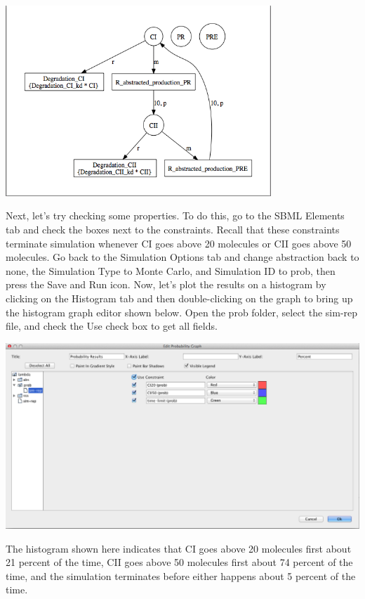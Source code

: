 \documentclass[titlepage,11pt]{article}
\begin{document}
\begin{center}
\includegraphics[width=100mm]{screenshots/viewNetworkAbs}
\end{center}

Next, let's try checking some properties.  To do this, go to the SBML Elements tab and check the boxes next to the constraints.  Recall that these constraints terminate simulation whenever CI goes above 20 molecules or CII goes above 50 molecules.  Go back to the Simulation Options tab and change abstraction back to none, the Simulation Type to Monte Carlo, and Simulation ID to prob, then press the Save and Run icon.  Now, let's plot the results on a histogram by clicking on the Histogram tab and then double-clicking on the graph to bring up the histogram graph editor shown below.  Open the prob folder, select the sim-rep file, and check the Use check box to get all fields.  

\begin{center}
\includegraphics[width=160mm]{screenshots/editProbGraph}
\end{center}

The histogram shown here indicates that CI goes above 20 molecules first about 21 percent of the time, CII goes above 50 molecules first about 74 percent of the time, and the simulation terminates before either happens about 5 percent of the time.
\end{document}
